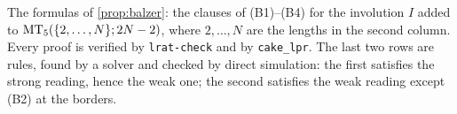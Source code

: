 \begin{table}[t]
\centering\small
\caption{The formulas of \cref{prop:balzer}: the clauses of (B1)--(B4) for the
involution $I$ added to $\MT_5(\{2,\dots,N\};2N-2)$, where $2,\dots,N$ are the
lengths in the second column. Every proof is verified by \texttt{lrat-check} and
by \texttt{cake\_lpr}.
The last two rows are rules, found by a solver and checked by direct
simulation: the first satisfies the strong reading, hence the weak one; the
second satisfies the weak reading except (B2) at the borders.}
\label{tab:balzer}

\end{table}
